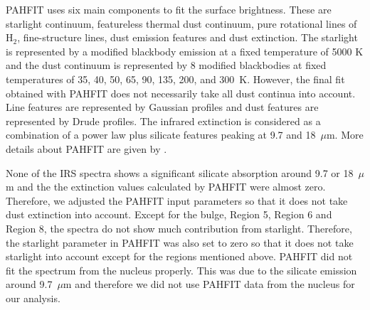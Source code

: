PAHFIT uses six main components to fit the surface brightness. These are starlight continuum, featureless thermal dust continuum, pure rotational lines of H$_2$, fine-structure lines, dust emission features and dust extinction. The starlight is represented by a modified blackbody emission at a fixed temperature of 5000 K and the dust continuum is represented by 8 modified blackbodies at fixed temperatures of 35, 40, 50, 65, 90, 135, 200, and 300~K. However, the final fit obtained with PAHFIT does not necessarily take all dust continua into account. Line features are represented by Gaussian profiles and dust features are represented by Drude profiles. The infrared extinction is considered as a combination of a power law plus silicate features peaking at 9.7 and 18~$\mu$m. More details about PAHFIT are given by \citet{Smith:2007lr}.


None of the IRS spectra shows a significant silicate absorption around 9.7 or 18~$\mu$m and the the extinction values calculated by PAHFIT were almost zero. Therefore, we adjusted the PAHFIT input parameters so that it does not take dust extinction into account. Except for the bulge, Region 5, Region 6 and Region 8, the spectra do not show much contribution from starlight. 
Therefore, the starlight parameter in PAHFIT was also set to zero so that it does not take starlight into account except for the regions mentioned above. 
PAHFIT did not fit the spectrum from the nucleus properly. This was due to the silicate emission around 9.7~$\mu$m and therefore we did not use PAHFIT data from the nucleus for our analysis.

